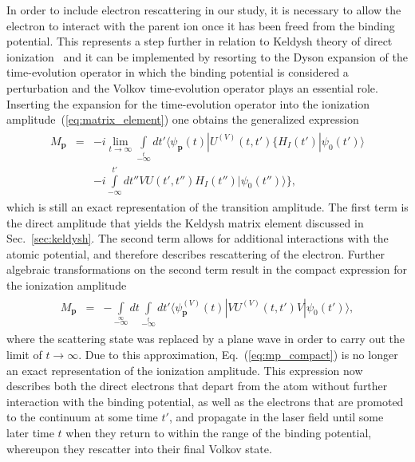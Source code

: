 In order to include electron rescattering in our study, it is
necessary to allow the electron to interact with the parent ion once
it has been freed from the binding potential. This represents a step
further in relation to Keldysh theory of direct
ionization~\cite{KeldyshSFA} and it can be implemented by resorting to
the Dyson expansion of the time-evolution operator in which the
binding potential is considered a perturbation and the Volkov
time-evolution operator plays an essential role. Inserting the
expansion for the time-evolution operator into the ionization
amplitude~(\ref{eq:matrix_element}) one obtains the generalized
expression~\cite{Kopold_1997sfa}
%
\begin{eqnarray}
\label{eq:mp_2terms}
\begin{split}
M_{\mathbf{p}} & = & -i \lim\limits_{t\to\infty} \int\limits_{-\infty}\limits^{t}
dt' \langle \psi_{\mathbf{p}}(t) | U^{(V)}(t, t') \{ H_{I}(t') | \psi_{0}(t') \rangle \\
& &
-i \int\limits_{-\infty}^{t'} dt'' V U(t', t'') H_{I}(t'') | \psi_{0}(t'') \rangle \},
\end{split}
\end{eqnarray}
%
which is still an exact representation of the transition
amplitude. The first term is the direct amplitude that yields the
Keldysh matrix element discussed in Sec.~\ref{sec:keldysh}. The second
term allows for additional interactions with the atomic potential, and
therefore describes rescattering of the electron. Further algebraic
transformations on the second term result in the compact expression
for the ionization amplitude~\cite{Kopold_1997sfa}
%
\begin{eqnarray}
\label{eq:mp_compact}
\begin{split}
M_{\mathbf{p}} & = & - \int\limits_{-\infty}\limits^{\infty} dt
\int\limits_{-\infty}\limits^{t} dt' \langle \psi_{\mathbf{p}}^{(V)}(t)
| V U^{(V)}(t, t') V | \psi_{0}(t') \rangle,
\end{split}
\end{eqnarray}
%
where the scattering state was replaced by a plane wave in order to
carry out the limit of $t\to\infty$. Due to this approximation,
Eq.~(\ref{eq:mp_compact}) is no longer an exact representation of the
ionization amplitude. This expression now describes both the direct
electrons that depart from the atom without further interaction with
the binding potential, as well as the electrons that are promoted to
the continuum at some time $t'$, and propagate in the laser field
until some later time $t$ when they return to within the range of the
binding potential, whereupon they rescatter into their final Volkov
state.

